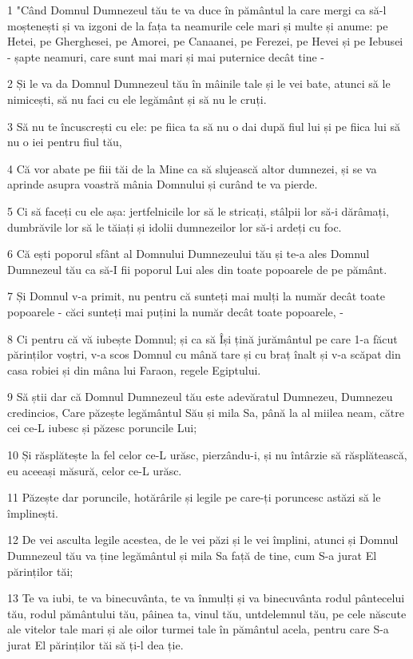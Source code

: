 \par 1 "Când Domnul Dumnezeul tău te va duce în pământul la care mergi ca să-l moștenești și va izgoni de la fața ta neamurile cele mari și multe și anume: pe Hetei, pe Gherghesei, pe Amorei, pe Canaanei, pe Ferezei, pe Hevei și pe Iebusei - șapte neamuri, care sunt mai mari și mai puternice decât tine -
\par 2 Și le va da Domnul Dumnezeul tău în mâinile tale și le vei bate, atunci să le nimicești, să nu faci cu ele legământ și să nu le cruți.
\par 3 Să nu te încuscrești cu ele: pe fiica ta să nu o dai după fiul lui și pe fiica lui să nu o iei pentru fiul tău,
\par 4 Că vor abate pe fiii tăi de la Mine ca să slujească altor dumnezei, și se va aprinde asupra voastră mânia Domnului și curând te va pierde.
\par 5 Ci să faceți cu ele așa: jertfelnicile lor să le stricați, stâlpii lor să-i dărâmați, dumbrăvile lor să le tăiați și idolii dumnezeilor lor să-i ardeți cu foc.
\par 6 Că ești poporul sfânt al Domnului Dumnezeului tău și te-a ales Domnul Dumnezeul tău ca să-I fii poporul Lui ales din toate popoarele de pe pământ.
\par 7 Și Domnul v-a primit, nu pentru că sunteți mai mulți la număr decât toate popoarele - căci sunteți mai puțini la număr decât toate popoarele, -
\par 8 Ci pentru că vă iubește Domnul; și ca să Își țină jurământul pe care 1-a făcut părinților voștri, v-a scos Domnul cu mână tare și cu braț înalt și v-a scăpat din casa robiei și din mâna lui Faraon, regele Egiptului.
\par 9 Să știi dar că Domnul Dumnezeul tău este adevăratul Dumnezeu, Dumnezeu credincios, Care păzește legământul Său și mila Sa, până la al miilea neam, către cei ce-L iubesc și păzesc poruncile Lui;
\par 10 Și răsplătește la fel celor ce-L urăsc, pierzându-i, și nu întârzie să răsplătească, eu aceeași măsură, celor ce-L urăsc.
\par 11 Păzește dar poruncile, hotărârile și legile pe care-ți poruncesc astăzi să le împlinești.
\par 12 De vei asculta legile acestea, de le vei păzi și le vei împlini, atunci și Domnul Dumnezeul tău va ține legământul și mila Sa față de tine, cum S-a jurat El părinților tăi;
\par 13 Te va iubi, te va binecuvânta, te va înmulți și va binecuvânta rodul pântecelui tău, rodul pământului tău, pâinea ta, vinul tău, untdelemnul tău, pe cele născute ale vitelor tale mari și ale oilor turmei tale în pământul acela, pentru care S-a jurat El părinților tăi să ți-l dea ție.
